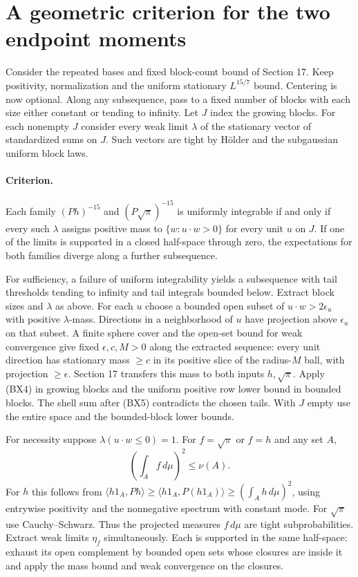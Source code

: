\section{A geometric criterion for the two endpoint moments}
Consider the repeated bases and fixed block-count bound of Section 17.
Keep positivity, normalization and the uniform stationary $L^{15/7}$ bound.
Centering is now optional. Along any subsequence, pass to a fixed number of
blocks with each size either constant or tending to infinity. Let $J$ index
the growing blocks. For each nonempty $J$ consider every weak limit $\lambda$
of the stationary vector of standardized sums on $J$. Such vectors are tight
by H\"older and the subgaussian uniform block laws.

\paragraph{Criterion.} Each family $(Ph)^{-15}$ and $(P\sqrt\pi)^{-15}$
is uniformly integrable if and only if every such $\lambda$ assigns
positive mass to $\{w:u\cdot w>0\}$ for every unit $u$ on $J$.
If one of the limits is supported in a closed half-space through zero,
the expectations for both families diverge along a further subsequence.

For sufficiency, a failure of uniform integrability yields a subsequence
with tail thresholds tending to infinity and tail integrals bounded below.
Extract block sizes and $\lambda$ as above. For each $u$ choose a bounded
open subset of $u\cdot w>2\epsilon_u$ with positive $\lambda$-mass.
Directions in a neighborhood of $u$ have projection above $\epsilon_u$ on
that subset. A finite sphere cover and the open-set bound for weak convergence
give fixed $\epsilon,c,M>0$ along the extracted sequence: every unit direction
has stationary mass $\ge c$ in its positive slice of the radius-$M$ ball,
with projection $\ge\epsilon$. Section 17 transfers this mass to both
inputs $h,\sqrt\pi$. Apply (BX4) in growing blocks and the uniform positive
row lower bound in bounded blocks. The shell sum after (BX5) contradicts the
chosen tails. With $J$ empty use the entire space and the bounded-block
lower bounds.

For necessity suppose $\lambda(u\cdot w\le0)=1$. For $f=\sqrt\pi$ or
$f=h$ and any set $A$,
\[
                 \left(\int_A f\,d\mu\right)^2\le\nu(A).
\]
For $h$ this follows from
$\langle h1_A,Ph\rangle\ge\langle h1_A,P(h1_A)\rangle
\ge(\int_A h\,d\mu)^2$, using entrywise positivity and the nonnegative
spectrum with constant mode. For $\sqrt\pi$ use Cauchy--Schwarz.
Thus the projected measures $f\,d\mu$ are tight subprobabilities.
Extract weak limits $\eta_f$ simultaneously. Each is supported in the same
half-space: exhaust its open complement by bounded open sets whose closures
are inside it and apply the mass bound and weak convergence on the closures.

